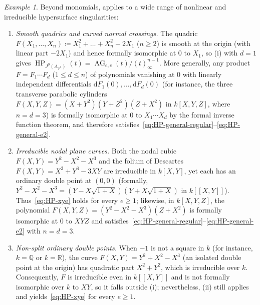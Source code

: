 \documentclass[a4paper, 12pt, reqno]{amsart}
\theoremstyle{remark}
\newtheorem{example}[theorem]{Example}
\begin{document}
\begin{example}
  \label{exa:nontrivial-intro}
  Beyond monomials,
   applies to a wide range of nonlinear and irreducible hypersurface singularities:
  \begin{enumerate}
  \item \emph{Smooth quadrics and curved normal crossings.}
    The quadric $F(X_1, \dots, X_n) \coloneq X_1^2 + \dots + X_n^2 - 2 X_1$ ($n \ge 2$) is smooth at the origin (with linear part $-2 X_1$) and hence formally isomorphic at $0$ to $X_1$,
    so (i) with $d = 1$ gives $\operatorname{HP}_{J^0(A_{F^e})}(t) = \operatorname{AG}_{e, e}(t) / (t)_\infty^{n - 1}$.
    More generally,
    any product $F = F_1 \cdots F_d$ ($1 \le d \le n$) of polynomials vanishing at $0$ with linearly independent differentials $\mathrm{d}F_1(0), \dots, \mathrm{d}F_d(0)$
    (for instance, the three transverse parabolic cylinders $F(X, Y, Z) = (X + Y^2)(Y + Z^2)(Z + X^2)$ in $k[X, Y, Z]$, where $n = d = 3$)
    is formally isomorphic at $0$ to $X_1 \cdots X_d$ by the formal inverse function theorem,
    and therefore satisfies~\eqref{eq:HP-general-regular}--\eqref{eq:HP-general-e2}.
  \item \emph{Irreducible nodal plane curves.}
    Both the nodal cubic $F(X, Y) = Y^2 - X^2 - X^3$ and the folium of Descartes $F(X, Y) = X^3 + Y^3 - 3 X Y$ are irreducible in $k[X, Y]$,
    yet each has an ordinary double point at $(0, 0)$
    (formally, $Y^2 - X^2 - X^3 = (Y - X\sqrt{1 + X})(Y + X\sqrt{1 + X})$ in $k[[X, Y]]$).
    Thus~\eqref{eq:HP-xye} holds for every $e \ge 1$;
    likewise, in $k[X, Y, Z]$,
    the polynomial $F(X, Y, Z) = (Y^2 - X^2 - X^3)(Z + X^2)$ is formally isomorphic at $0$ to $X Y Z$ and satisfies~\eqref{eq:HP-general-regular}--\eqref{eq:HP-general-e2} with $n = d = 3$.
  \item \emph{Non-split ordinary double points.}
    When $-1$ is not a square in $k$ (for instance, $k = \mathbb{Q}$ or $k = \mathbb{R}$),
    the curve $F(X, Y) = Y^2 + X^2 - X^3$ (an isolated double point at the origin) has quadratic part $X^2 + Y^2$,
    which is irreducible over $k$.
    Consequently, $F$ is irreducible even in $k[[X, Y]]$ and is not formally isomorphic over $k$ to $X Y$,
    so it falls outside (i);
    nevertheless, (ii) still applies and yields~\eqref{eq:HP-xye} for every $e \ge 1$.
  \end{enumerate}
\end{example}
\end{document}
